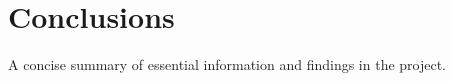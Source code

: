\chapter{Conclusions}
\label{chap:9_conclusions}

A concise summary of essential information and findings in the project.
